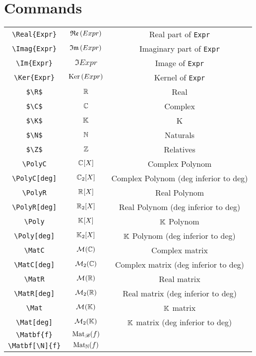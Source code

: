 \documentclass[french]{article}
\begin{document}

\section{Commands}

\begin{tabular}{|c|c|c|}
    \hline
    \verb$\Real{Expr}$ & $\mathfrak{Re}\left({Expr}\right)$ & Real part of \verb|Expr| \\
    \verb$\Imag{Expr}$& $\mathfrak{Im}\left({Expr}\right)$  & Imaginary part of \verb|Expr|\\
    \hline
    \verb$\Im{Expr}$ & $\Im{Expr}$ & Image of \verb|Expr| \\ 
    \verb$\Ker{Expr}$ & $\text{Ker}\left({Expr}\right)$ & Kernel of \verb|Expr| \\
    \hline
    \verb|$\R$| & $\mathbb{R}$ & Real \\
    \verb|$\C$| & $\mathbb{C}$ & Complex \\
    \verb|$\K$| & $\mathbb{K}$ & K \\
    \verb|$\N$| & $\mathbb{N}$ & Naturals \\
    \verb|$\Z$| & $\mathbb{Z}$ & Relatives \\
    \hline
    \verb$\PolyC$ & $\PolyC$ & Complex Polynom \\ 
    \verb$\PolyC[deg]$ & $\PolyC[2]$ & Complex Polynom (deg inferior to deg) \\
    \verb$\PolyR$ & $\PolyR$ & Real Polynom \\ 
    \verb$\PolyR[deg]$ & $\PolyR[2]$ & Real Polynom (deg inferior to deg) \\
    \verb$\Poly$ & $\Poly$ & $\mathbb{K}$ Polynom \\ 
    \verb$\Poly[deg]$ & $\Poly[2]$ & $\mathbb{K}$ Polynom (deg inferior to deg) \\
    \hline
    \verb$\MatC$ & $\MatC$ & Complex matrix \\ 
    \verb$\MatC[deg]$ & $\MatC[2]$ & Complex matrix (deg inferior to deg) \\
    \verb$\MatR$ & $\MatR$ & Real matrix \\ 
    \verb$\MatR[deg]$ & $\MatR[2]$ & Real matrix (deg inferior to deg) \\
    \verb$\Mat$ & $\Mat$ & $\mathbb{K}$ matrix \\ 
    \verb$\Mat[deg]$ & $\Mat[2]$ & $\mathbb{K}$ matrix (deg inferior to deg) \\
    \hline
    \verb$\Matbf{f}$ & $\MatBf{f}$ & \\
    \verb$\Matbf[\N]{f}$ & $\MatBf[\N]{f}$ & \\

\end{tabular}
\end{document}
